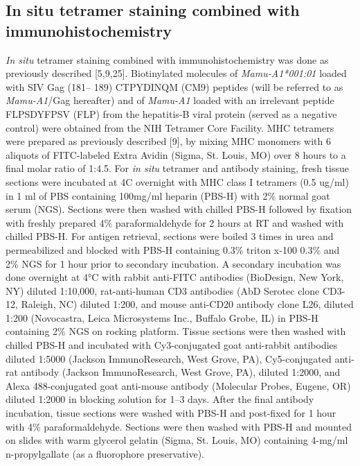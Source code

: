 \documentclass{article}
\begin{document}
\subsection*{In situ tetramer staining combined with immunohistochemistry}

\textit{In situ} tetramer staining combined with immunohistochemistry was done as previously described [5,9,25]. Biotinylated molecules of \textit{Mamu-A1*001:01} loaded with SIV Gag (181– 189) CTPYDINQM (CM9) peptides (will be referred to as \textit{Mamu-A1}/Gag hereafter) and of \textit{Mamu-A1} loaded with an irrelevant peptide FLPSDYFPSV (FLP) from the hepatitis-B viral protein (served as a negative control) were obtained from the NIH Tetramer Core Facility. MHC tetramers were prepared as previously described [9], by mixing MHC monomers with 6 aliquots of FITC-labeled Extra Avidin (Sigma, St. Louis, MO) over 8 hours to a final molar ratio of 1:4.5. For \textit{in situ} tetramer and antibody staining, fresh tissue sections were incubated at 4C overnight with MHC class I tetramers (0.5 ug/ml) in 1 ml of PBS containing 100mg/ml heparin (PBS-H) with 2\% normal goat serum (NGS). Sections were then washed with chilled PBS-H followed by fixation with freshly prepared 4\% paraformaldehyde for 2 hours at RT and washed with chilled PBS-H. For antigen retrieval, sections were boiled 3 times in urea and permeabilized and blocked with PBS-H containing 0.3\% triton x-100 0.3\% and 2\% NGS for 1 hour prior to secondary incubation. A secondary incubation was done overnight at 4°C with rabbit anti-FITC antibodies (BioDesign, New York, NY) diluted 1:10,000, rat-anti-human CD3 antibodies (AbD Serotec clone CD3-12, Raleigh, NC) diluted 1:200, and mouse anti-CD20 antibody clone L26, diluted 1:200 (Novocastra, Leica Microsystems Inc., Buffalo Grobe, IL) in PBS-H containing 2\% NGS on rocking platform. Tissue sections were then washed with chilled PBS-H and incubated with Cy3-conjugated goat anti-rabbit antibodies diluted 1:5000 (Jackson ImmunoResearch, West Grove, PA), Cy5-conjugated anti-rat antibody (Jackson ImmunoResearch, West Grove, PA), diluted 1:2000, and Alexa 488-conjugated goat anti-mouse antibody (Molecular Probes, Eugene, OR) diluted 1:2000 in blocking solution for 1–3 days. After the final antibody incubation, tissue sections were washed with PBS-H and post-fixed for 1 hour with 4\% paraformaldehyde. Sections were then washed with PBS-H and mounted on slides with warm glycerol gelatin (Sigma, St. Louis, MO) containing 4-mg/ml n-propylgallate (as a fluorophore preservative).
\end{document}
